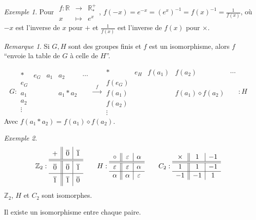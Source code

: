 \documentclass{report}
\theoremstyle{definition}
\theoremstyle{remark}
\newtheorem*{exem}{Exemple}
\newtheorem*{rema}{Remarque}
\begin{document}
	\begin{exem}
		Pour $\begin{array}{rcl}
			f:\mathbb{R}&\to&\mathbb{R}^+_*\\
			x&\mapsto&e^x
		\end{array}$, $f(-x)=e^{-x}=(e^x)^{-1}=f(x)^{-1}=\frac{1}{f(x)}$, o\`u $-x$ est l'inverse de $x$ pour $+$ et $\frac{1}{f(x)}$ est l'inverse de $f(x)$ pour $\times$.
	\end{exem}
	\begin{rema}
		Si $G,H$ sont des groupes finis et $f$ est un isomorphisme, alors $f$ ``envoie la table de $G$ \`a celle de $H$''.

		\[
		G:
		\begin{array}{c||c|c|c|c}
			*&e_G&a_1&a_2&\dotsb\\
			\hline\hline
			e_G&&&&\\
			\hline
			a_1&&&a_1*a_2&\\
			\hline
			a_2&&&&\\
			\hline
			\vdots&&&&
		\end{array}
		\xrightarrow{~~~f~~~}
		\begin{array}{c||c|c|c|c}
			*&e_H&f(a_1)&f(a_2)&\dotsb\\
			\hline\hline
			f(e_G)&&&&\\
			\hline
			f(a_1)&&&f(a_1) \diamond f(a_2)&\\
			\hline
			f(a_2)&&&&\\
			\hline
			\vdots&&&&
		\end{array}
		:H
		\]
		Avec $f(a_1*a_2)=f(a_1) \diamond f(a_2)$.
		\begin{exem}
			\[
			\mathbb{Z}_2:
			\renewcommand{\arraystretch}{1.5}
			\begin{array}{c||c|c}
				+&\overline0&\overline1\\
				\hline\hline
				\overline0&\overline0&\overline1\\
				\hline
				\overline1&\overline1&\overline0
			\end{array}
			\renewcommand{\arraystretch}{1}
			\qquad
			H:
			\begin{array}{c||c|c}
				\circ&\varepsilon&\alpha\\
				\hline\hline
				\varepsilon&\varepsilon&\alpha\\
				\hline
				\alpha&\alpha&\varepsilon
			\end{array}
			\qquad
			C_2:
			\begin{array}{c||c|c}
				\times&1&-1\\
				\hline\hline
				1&1&-1\\
				\hline
				-1&-1&1
			\end{array}
			\]
			$\mathbb{Z}_2$, $H$ et $C_2$ sont isomorphes.

			Il existe un isomorphisme entre chaque paire.
		\end{exem}
	\end{rema}
\end{document}

